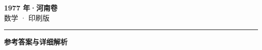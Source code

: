 \documentclass[zihao=5, a4paper]{ctexart}
\begin{document}
\begin{center}
  {\Large\bfseries 1977 年·河南卷}\\[4pt]
  {\large 数学 · 印刷版}
\end{center}
\medskip
{}

\par\bigskip\hrule\bigskip
{}
\begin{center}{\large\bfseries 参考答案与详细解析}\end{center}
\smallskip

\end{document}
